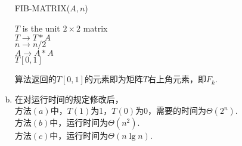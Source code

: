\documentclass[twocolumn]{article}
\newenvironment{SChinese}{
	\CJKfamily{gbsn}
	\CJKtilde
	\CJKnospace}{}
\begin{document}
\begin{CJK}{UTF8}{}
\begin{SChinese}
\begin{enumerate}[a.]
				\begin{algorithm}
					\caption{FIB-MATRIX($A,n$)}
					\begin{algorithmic}[1]
					\STATE $T$ is the unit $2\times2$ matrix \\
					\STATE $T\rightarrow T*A$ \\
					\ENDIF
					\STATE $n\rightarrow n/2$ \\
					\STATE $A\rightarrow A*A$ \\
					\ENDWHILE
					\RETURN $T[0,1]$	
					\end{algorithmic}
				\end{algorithm}
				算法返回的$T[0,1]$的元素即为矩阵$T$右上角元素，即$F_k$.
				\item 在对运行时间的规定修改后，\\
				方法$(a)$中，$T(1)$为1，$T(0)$为0，需要的时间为$\Theta(2^n)$.\\
				方法$(b)$中，运行时间为$\Theta(n^2)$.\\
				方法$(c)$中，运行时间为$\Theta(n\lg n)$.\\
				\end{enumerate}
		
		\end{SChinese}
	\end{CJK}
\end{document}
